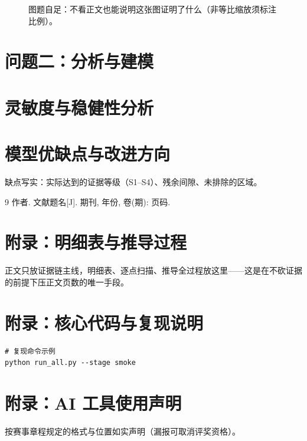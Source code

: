 \documentclass[12pt,a4paper]{ctexart}
\begin{document}
\begin{figure}[htbp]
  \centering
  \caption{图题自足：不看正文也能说明这张图证明了什么（非等比缩放须标注比例）。}
  \label{fig:q1main}
\end{figure}

\section{问题二：分析与建模}

\section{灵敏度与稳健性分析}

\section{模型优缺点与改进方向}
缺点写实：实际达到的证据等级（S1--S4）、残余间隙、未排除的区域。

\begin{thebibliography}{9}
   作者. 文献题名[J]. 期刊, 年份, 卷(期): 页码.
\end{thebibliography}

\appendix
\section{附录：明细表与推导过程}
正文只放证据链主线，明细表、逐点扫描、推导全过程放这里——这是在不砍证据的前提下压正文页数的唯一手段。

\section{附录：核心代码与复现说明}
\begin{lstlisting}[basicstyle=\ttfamily\small,breaklines=true]
# 复现命令示例
python run_all.py --stage smoke
\end{lstlisting}

\section{附录：AI 工具使用声明}
按赛事章程规定的格式与位置如实声明（漏报可取消评奖资格）。
\end{document}

